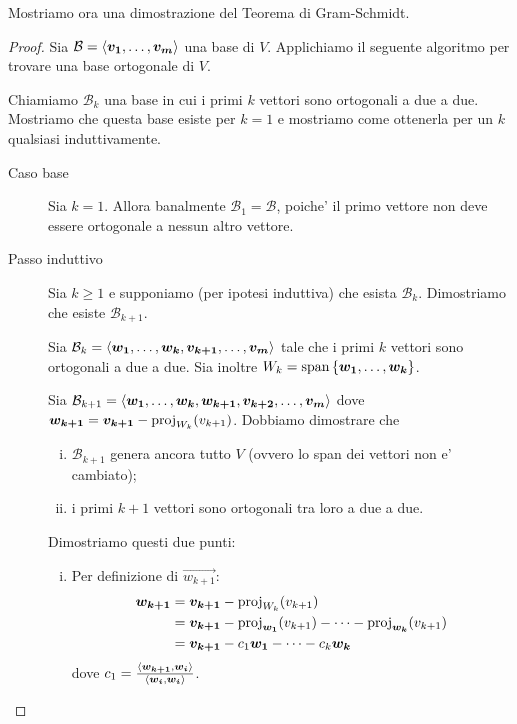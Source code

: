 Mostriamo ora una dimostrazione del Teorema di Gram-Schmidt.

\gramschmidt*
\begin{proof}
    Sia $\mathcal{B} = \basis{\vec{v_1}, \dots, \vec{v_m}}$ una base di $V$. Applichiamo il seguente algoritmo per trovare una base ortogonale di $V$.

    Chiamiamo $\mathcal{B}_k$ una base in cui i primi $k$ vettori sono ortogonali a due a due. Mostriamo che questa base esiste per $k = 1$ e mostriamo come ottenerla per un $k$ qualsiasi induttivamente.

    \begin{description}
        \item[Caso base] Sia $k = 1$. Allora banalmente $\mathcal{B}_1 = \mathcal{B}$, poiche' il primo vettore non deve essere ortogonale a nessun altro vettore.
        \item[Passo induttivo] Sia $k \geq 1$ e supponiamo (per ipotesi induttiva) che esista $\mathcal{B}_{k}$. Dimostriamo che esiste $\mathcal{B}_{k+1}$.
        
        Sia $\mathcal{B}_k = \basis{\vec{w_1}, \dots, \vec{w_k}, \vec{v_{k+1}}, \dots, \vec{v_m}}$ tale che i primi $k$ vettori sono ortogonali a due a due. Sia inoltre $W_k = \Span{\vec{w_1}, \dots, \vec{w_k}}$.
        
        Sia $\mathcal{B}_{k+1} = \basis{\vec{w_1}, \dots, \vec{w_k}, \vec{w_{k+1}}, \vec{v_{k+2}}, \dots, \vec{v_m}}$ dove $\vec{w_{k+1}} = \vec{v_{k+1}} - \proj{v_{k+1}}{W_k}$.
        Dobbiamo dimostrare che \begin{enumerate}[(i)]
            \item $\mathcal{B}_{k+1}$ genera ancora tutto $V$ (ovvero lo span dei vettori non e' cambiato);
            \item i primi $k+1$ vettori sono ortogonali tra loro a due a due.
        \end{enumerate}

        Dimostriamo questi due punti:
        \begin{enumerate}[(i)]
            \item Per definizione di $\vec{w_{k+1}}$:
            \begin{align*}
                \vec{w_{k+1}} &= \vec{v_{k+1}} - \proj{v_{k+1}}{W_k} \\
                &= \vec{v_{k+1}} - \proj{v_{k+1}}{\vec{w_1}} - \dots - \proj{v_{k+1}}{\vec{w_k}}\\
                &= \vec{v_{k+1}} - c_1{\vec{w_1}} - \dots - c_k{\vec{w_k}}
            \end{align*} dove $c_1 = \frac{\innerprod{\vec{w_{k+1}}}{\vec{w_i}}}{\innerprod{\vec{w_i}}{\vec{w_i}}}$.


\end{enumerate}
\end{description}
\end{proof}
